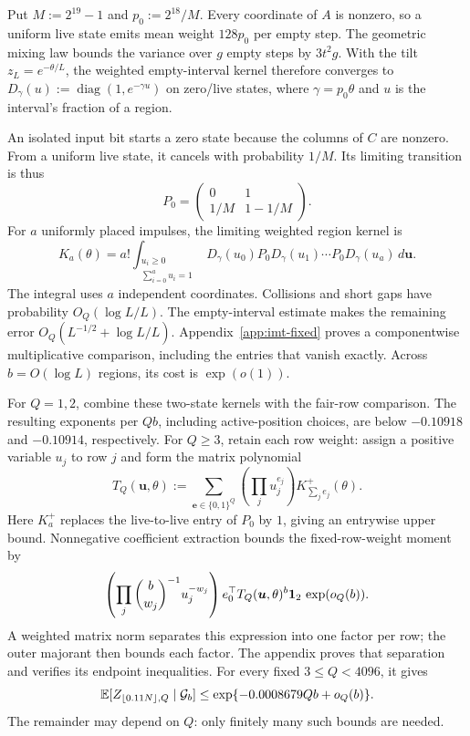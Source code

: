 Put $M:=2^{19}-1$ and $p_0:=2^{18}/M$.
Every coordinate of $A$ is nonzero, so a uniform live state emits
mean weight $128p_0$ per empty step.
The geometric mixing law bounds the variance over $g$ empty steps by
$3t^2g$. With the tilt $z_L=e^{-\theta/L}$, the weighted empty-interval
kernel therefore converges to
$D_\gamma(u):=\operatorname{diag}(1,e^{-\gamma u})$ on zero/live states,
where $\gamma=p_0\theta$ and $u$ is the interval's fraction of a region.

An isolated input bit starts a zero state because the columns of $C$
are nonzero. From a uniform live state, it cancels with probability $1/M$.
Its limiting transition is thus
\[
 P_0=\begin{pmatrix}0&1\\1/M&1-1/M\end{pmatrix}.
\]
For $a$ uniformly placed impulses, the limiting weighted region kernel is
\[
 K_a(\theta)=a!\int_{\substack{u_i\ge0\\\sum_{i=0}^a u_i=1}}
 D_\gamma(u_0)P_0D_\gamma(u_1)\cdots P_0D_\gamma(u_a)
 \,d\boldsymbol u.
\]
The integral uses $a$ independent coordinates.
Collisions and short gaps have probability $O_Q(\log L/L)$.
The empty-interval estimate makes the remaining error
$O_Q(L^{-1/2}+\log L/L)$.
Appendix~\ref{app:imt-fixed} proves a componentwise multiplicative comparison,
including the entries that vanish exactly. Across $b=O(\log L)$ regions,
its cost is $\exp(o(1))$.

For $Q=1,2$, combine these two-state kernels with the fair-row comparison.
The resulting exponents per $Qb$, including active-position choices,
are below $-0.10918$ and $-0.10914$, respectively.
For $Q\ge3$, retain each row weight: assign a positive variable $u_j$
to row $j$ and form the matrix polynomial
\[
 T_Q(\boldsymbol u,\theta)
 :=\sum_{\boldsymbol e\in\{0,1\}^Q}
 \left(\prod_j u_j^{e_j}\right)K^+_{\sum_j e_j}(\theta).
\]
Here $K_a^+$ replaces the live-to-live entry of $P_0$ by $1$, giving an
entrywise upper bound. Nonnegative coefficient extraction bounds the
fixed-row-weight moment by
\[
 \left(\prod_j\binom b{w_j}^{-1}u_j^{-w_j}\right)
 e_0^\top T_Q(\boldsymbol u,\theta)^b\mathbf 1_2\,\exp(o_Q(b)).
\]
A weighted matrix norm separates this expression into one factor per row;
the outer majorant then bounds each factor.
The appendix proves that separation and verifies its endpoint inequalities.
For every fixed $3\le Q<4096$, it gives
\[
 \mathbb E[Z_{\lfloor0.11N\rfloor,Q}\mid\mathcal G_b]
 \le\exp\{-0.0008679Qb+o_Q(b)\}.
\]
The remainder may depend on $Q$: only finitely many such bounds are needed.


